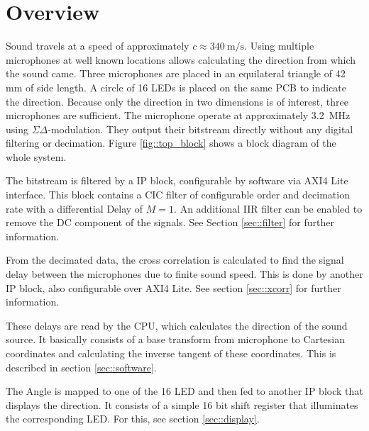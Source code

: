 \section{Overview}
Sound travels at a speed of approximately $c\approx \SI{340}{\meter\per\s}$.
Using multiple microphones at well known locations allows calculating the direction from which the sound came.
Three microphones are placed in an equilateral triangle of 42 mm of side length.
A circle of 16 LEDs is placed on the same PCB to indicate the direction.
Because only the direction in two dimensions is of interest, three microphones are sufficient.
The microphone operate at approximately \SI{3.2}{\mega\hertz} using $\Sigma\Delta$-modulation.
They output their bitstream directly without any digital filtering or decimation.
Figure \ref{fig::top_block} shows a block diagram of the whole system.

The bitstream is filtered by a IP block, configurable by software via AXI4 Lite interface.
This block contains a CIC filter of configurable order and decimation rate with a differential Delay of $M=1$.
An additional IIR filter can be enabled to remove the DC component of the signals.
See Section \ref{sec::filter} for further information.

From the decimated data, the cross correlation is calculated to find the signal delay between the microphones due to finite sound speed.
This is done by another IP block, also configurable over AXI4 Lite.
See section \ref{sec::xcorr} for further information.

These delays are read by the CPU, which calculates the direction of the sound source. 
It basically consists of a base transform from microphone to Cartesian coordinates and calculating the inverse tangent of these coordinates.
This is described in section \ref{sec::software}.

The Angle is mapped to one of the 16 LED and then fed to another IP block that displays the direction.
It consists of a simple 16 bit shift register that illuminates the corresponding LED.
For this, see section \ref{sec::display}.

